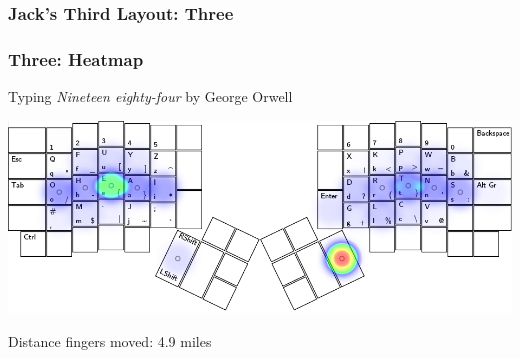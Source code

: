 \documentclass{beamer}
\begin{document}
\begin{frame}
    \frametitle{Jack's Third Layout: Three}
    \begin{center}
    \end{center}
\end{frame}

\begin{frame}
    \frametitle{Three: Heatmap}
    Typing \emph{Nineteen eighty-four} by George Orwell
    \begin{center}
        \includegraphics[width=\linewidth]{graphics/threeheat}\par
    Distance fingers moved: 4.9 miles
    \end{center}
\end{frame}
\end{document}
